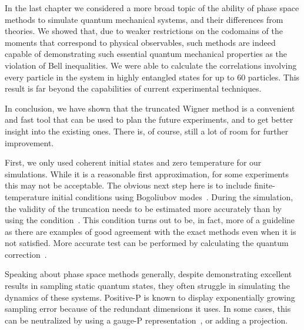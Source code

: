 In the last chapter we considered a more broad topic of the ability of phase space methods to simulate quantum mechanical systems, and their differences from  theories.
We showed that, due to weaker restrictions on the codomains of the moments that correspond to physical observables, such methods are indeed capable of demonstrating such essential quantum mechanical properties as the violation of Bell inequalities.
We were able to calculate the correlations involving every particle in the system in highly entangled  states for up to $60$ particles.
This result is far beyond the capabilities of current experimental techniques.

\centerline{\vfleuron}

In conclusion, we have shown that the truncated Wigner method is a convenient and fast tool that can be used to plan the future experiments, and to get better insight into the existing ones.
There is, of course, still a lot of room for further improvement.

First, we only used coherent initial states and zero temperature for our simulations.
While it is a reasonable first approximation, for some experiments this may not be acceptable.
The obvious next step here is to include finite-temperature initial conditions using Bogoliubov modes~\cite{Steel1998,Sinatra2002,Ruostekoski2005,Isella2006,Blakie2008}.
During the simulation, the validity of the truncation needs to be estimated more accurately than by using the condition~.
This condition turns out to be, in fact, more of a guideline as there are examples of good agreement with the exact methods even when it is not satisfied.
More accurate test can be performed by calculating the quantum correction~\cite{Polkovnikov2010}.

Speaking about phase space methods generally, despite demonstrating excellent results in sampling static quantum states, they often struggle in simulating the dynamics of these systems.
Positive-P is known to display exponentially growing sampling error because of the redundant dimensions it uses.
In some cases, this can be neutralized by using a gauge-P representation~\cite{Deuar2002,Deuar2005a}, or adding a projection.
